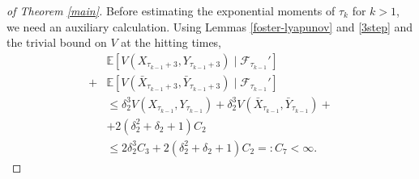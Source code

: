 \documentclass{article}
\def\mE{\mathbb{E}}
\begin{document}
\begin{proof}[of Theorem \ref{main}]
Before estimating the exponential moments of $\tau_{k}$ for $k>1$, we need 
an auxiliary calculation.
%
Using Lemmas \ref{foster-lyapunov} and \ref{3step} and the trivial bound on $V$ at the hitting times,
\begin{align}
& \nonumber\mE[V(X_{\tau_{k-1}+3},Y_{\tau_{k-1}+3})\mid \mathcal{F}_{\tau_{k-1}}']\\
+&\nonumber \mE[V(\bar X_{\tau_{k-1}+3},\bar Y_{\tau_{k-1}+3})\mid \mathcal{F}_{\tau_{k-1}}']\\
&\leq\nonumber \delta_2^3V(X_{\tau_{k-1}},Y_{\tau_{k-1}})+
\delta_2^3V(\bar X_{\tau_{k-1}},\bar Y_{\tau_{k-1}})+\\
&+\nonumber 2(\delta_2^2+\delta_2+1)C_2\\
&\leq 2\delta_2^3C_3+ 2(\delta_2^2+\delta_2+1)C_2=:
C_7 <\infty.\label{innerpart}    
\end{align}




\end{proof}
\end{document}
